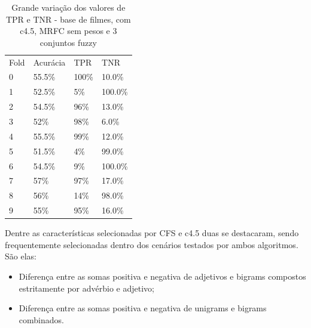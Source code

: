 \documentclass[template.tex]{subfiles}
\begin{document}

\begin{table}[htbp]
	\centering
    \begin{tabular}{llll}
    Fold & Acurácia & TPR & TNR \\
    0 & 55.5\% & 100\% & 10.0\% \\
    1 & 52.5\% & 5\% & 100.0\% \\
    2 & 54.5\% & 96\% & 13.0\% \\
    3 & 52\% & 98\% & 6.0\% \\
    4 & 55.5\% & 99\% & 12.0\% \\
    5 & 51.5\% & 4\% & 99.0\% \\
    6 & 54.5\% & 9\% & 100.0\% \\
    7 & 57\% & 97\% & 17.0\% \\
    8 & 56\% & 14\% & 98.0\% \\
    9 & 55\% & 95\% & 16.0\% \\
    \end{tabular}
    \caption{Grande variação dos valores de TPR e TNR - base de filmes, com c4.5, MRFC sem pesos e 3 conjuntos fuzzy}
    \label{table:movie_folds}
\end{table}


Dentre as características selecionadas por CFS e c4.5 duas se destacaram, sendo frequentemente selecionadas dentro dos cenários testados por ambos algoritmos. São elas:

\begin{itemize}
\item Diferença entre as somas positiva e negativa de adjetivos e bigrams compostos estritamente por advérbio e adjetivo;
\item Diferença entre as somas positiva e negativa de unigrams e bigrams combinados.
\end{itemize}
\end{document}
